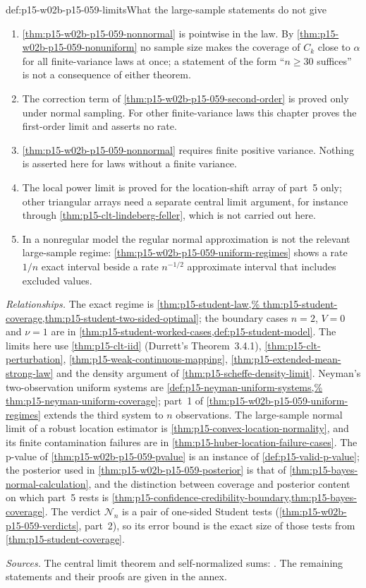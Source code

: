 \begin{hbwarning}{def:p15-w02b-p15-059-limits}{What the large-sample statements do not give}
\begin{enumerate}
\item \cref{thm:p15-w02b-p15-059-nonnormal} is pointwise in the law. By
\cref{thm:p15-w02b-p15-059-nonuniform} no sample size makes the coverage of
\(C_k\) close to \(\alpha\) for all finite-variance laws at once; a
statement of the form ``\(n\geq30\) suffices'' is not a consequence of
either theorem.
\item The correction term of \cref{thm:p15-w02b-p15-059-second-order} is
proved only under normal sampling. For other finite-variance laws this
chapter proves the first-order limit and asserts no rate.
\item \cref{thm:p15-w02b-p15-059-nonnormal} requires finite positive
variance. Nothing is asserted here for laws without a finite variance.
\item The local power limit is proved for the location-shift array of part~5
only; other triangular arrays need a separate central limit argument, for
instance through \cref{thm:p15-clt-lindeberg-feller}, which is not carried
out here.
\item In a nonregular model the regular normal approximation is not the
relevant large-sample regime: \cref{thm:p15-w02b-p15-059-uniform-regimes}
shows a rate \(1/n\) exact interval beside a rate \(n^{-1/2}\) approximate
interval that includes excluded values.
\end{enumerate}
\end{hbwarning}

\emph{Relationships.} The exact regime is \cref{thm:p15-student-law,%
thm:p15-student-coverage,thm:p15-student-two-sided-optimal}; the boundary
cases \(n=2\), \(V=0\) and \(\nu=1\) are in
\cref{thm:p15-student-worked-cases,def:p15-student-model}. The limits here
use \cref{thm:p15-clt-iid} (Durrett's Theorem~3.4.1),
\cref{thm:p15-clt-perturbation}, \cref{thm:p15-weak-continuous-mapping},
\cref{thm:p15-extended-mean-strong-law} and the density argument of
\cref{thm:p15-scheffe-density-limit}. Neyman's two-observation uniform
systems are \cref{def:p15-neyman-uniform-systems,%
thm:p15-neyman-uniform-coverage}; part~1 of
\cref{thm:p15-w02b-p15-059-uniform-regimes} extends the third system to
\(n\) observations. The large-sample normal limit of a robust location
estimator is \cref{thm:p15-convex-location-normality}, and its finite
contamination failures are in \cref{thm:p15-huber-location-failure-cases}.
The p-value of \cref{thm:p15-w02b-p15-059-pvalue} is an instance of
\cref{def:p15-valid-p-value}; the posterior used in
\cref{thm:p15-w02b-p15-059-posterior} is that of
\cref{thm:p15-bayes-normal-calculation}, and the distinction between
coverage and posterior content on which part~5 rests is
\cref{thm:p15-confidence-credibility-boundary,thm:p15-bayes-coverage}. The
verdict \(\mathcal N_n\) is a pair of one-sided Student tests
(\cref{thm:p15-w02b-p15-059-verdicts}, part~2), so its error bound is the
exact size of those tests from \cref{thm:p15-student-coverage}.

\emph{Sources.} The central limit theorem and self-normalized sums:
\cite[p.~144, Theorem~3.4.1; p.~147, Exercise~3.4.5]{DurrettPTEAuthor2019}.
The remaining statements and their proofs are given in the annex.
